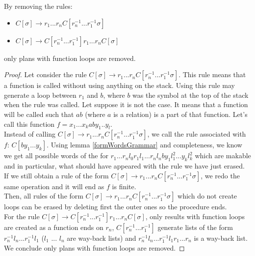 \documentclass[10pt,a4paper,draft]{article}
\begin{document}
\begin{theorem}
By removing the rules:
\begin{itemize}
 \item $C[\sigma] \rightarrow r_1 ... r_n C[r_{n}^{-1} ... r_1^{-1} \sigma]$
 \item $C[\sigma] \rightarrow C[r_{n}^{-1} ... r_1^{-1}] r_1 ... r_n C[\sigma]$
\end{itemize}
only plans with function loops are removed.
\end{theorem}

\begin{proof}
Let consider the rule $C[\sigma] \rightarrow r_1 ... r_n C[r_{n}^{-1} ... r_1^{-1} \sigma]$. This rule means that a function is called without using anything on the stack. Using this rule may generate a loop between $r_1$ and $b$, where $b$ was the symbol at the top of the stack when the rule was called. Let suppose it is not the case. It means that a function will be called such that  $a b$ (where $a$ is a relation) is a part of that function. Let's call this function $f = x_1 ... x_k a b y_1 .. y_l$.\\
Instead of calling $C[\sigma] \rightarrow r_1 ... r_n C[r_{n}^{-1} ... r_1^{-1} \sigma]$, we call the rule associated with $f$: $C[b y_1 ... y_k]$. Using lemma \ref{formWordsGrammar} and completeness, we know we get all possible words of the for $r_1 ... r_n l_0 r_1 l_1 ... r_n l_n b y_1 l_1^2... y_k l_k^2$ which are makable and in particular, what should have appeared with the rule we have just erased. If we still obtain a rule of the form $C[\sigma] \rightarrow r_1 ... r_n C[r_{n}^{-1} ... r_1^{-1} \sigma]$, we redo the same operation and it will end as $f$ is finite.\\
Then, all rules of the form $C[\sigma] \rightarrow r_1 ... r_n C[r_{n}^{-1} ... r_1^{-1} \sigma]$ which do not create loops can be erased by deleting first the outer ones so the procedure ends.\\
For the rule $C[\sigma] \rightarrow C[r_{n}^{-1} ... r_1^{-1}] r_1 ... r_n C[\sigma]$, only results with function loops are created as a function ends on $r_n$, $C[r_{n}^{-1} ... r_1^{-1}]$ generate lists of the form $r_{n}^{-1} l_n ... r_1^{-1} l_1$ ($l_1$ ... $l_n$ are way-back lists) and $r_{n}^{-1} l_n ... r_1^{-1} l_1 r_1 ... r_n$ is a way-back list.\\
We conclude only plans with function loops are removed.
\end{proof}



\end{document}
